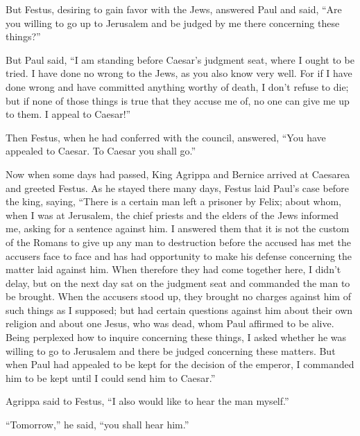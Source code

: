  But Festus, desiring to gain favor with the Jews, answered
Paul and said, ``Are you willing to go up to Jerusalem and be judged by
me there concerning these things?''

 But Paul said, ``I am standing before Caesar's judgment
seat, where I ought to be tried. I have done no wrong to the Jews, as
you also know very well.  For if I have done wrong and have
committed anything worthy of death, I don't refuse to die; but if none
of those things is true that they accuse me of, no one can give me up to
them. I appeal to Caesar!''

 Then Festus, when he had conferred with the council,
answered, ``You have appealed to Caesar. To Caesar you shall go.''

 Now when some days had passed, King Agrippa and Bernice
arrived at Caesarea and greeted Festus.  As he stayed there
many days, Festus laid Paul's case before the king, saying, ``There is a
certain man left a prisoner by Felix;  about whom, when I
was at Jerusalem, the chief priests and the elders of the Jews informed
me, asking for a sentence against him.  I answered them
that it is not the custom of the Romans to give up any man to
destruction before the accused has met the accusers face to face and has
had opportunity to make his defense concerning the matter laid against
him.  When therefore they had come together here, I didn't
delay, but on the next day sat on the judgment seat and commanded the
man to be brought.  When the accusers stood up, they
brought no charges against him of such things as I supposed;
 but had certain questions against him about their own
religion and about one Jesus, who was dead, whom Paul affirmed to be
alive.  Being perplexed how to inquire concerning these
things, I asked whether he was willing to go to Jerusalem and there be
judged concerning these matters.  But when Paul had
appealed to be kept for the decision of the emperor, I commanded him to
be kept until I could send him to Caesar.''

 Agrippa said to Festus, ``I also would like to hear the
man myself.''

``Tomorrow,'' he said, ``you shall hear him.''


